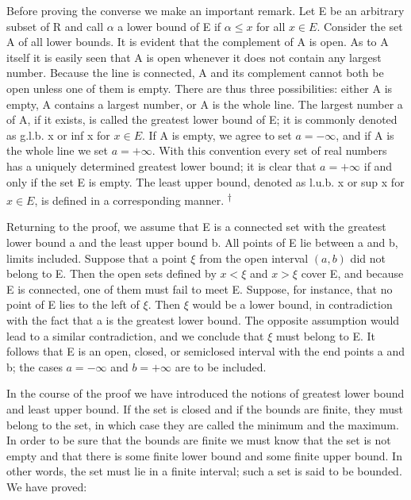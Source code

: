 Before proving the converse we make an important remark. Let E be an arbitrary subset of R and call $\alpha$ a lower bound of E if $\alpha \leq x$ for all $x \in E$. Consider the set A of all lower bounds. It is evident that the complement of A is open. As to A itself it is easily seen that A is open whenever it does not contain any largest number. Because the line is connected, A and its complement cannot both be open unless one of them is empty. There are thus three possibilities: either A is empty, A contains a largest number, or A is the whole line. The largest number a of A, if it exists, is called the greatest lower bound of E; it is commonly denoted as g.l.b. x or inf x for $x \in E$. If A is empty, we agree to set $a = -\infty$, and if A is the whole line we set $a = +\infty$. With this convention every set of real numbers has a uniquely determined greatest lower bound; it is clear that $a = +\infty$ if and only if the set E is empty. The least upper bound, denoted as l.u.b. x or sup x for $x \in E$, is defined in a corresponding manner. \hyperlink{fn:71:dagger}{\textsuperscript{\ensuremath{\dagger}}}

Returning to the proof, we assume that E is a connected set with the greatest lower bound a and the least upper bound b. All points of E lie between a and b, limits included. Suppose that a point $\xi$ from the open interval $(a,b)$ did not belong to E. Then the open sets defined by $x < \xi$ and $x > \xi$ cover E, and because E is connected, one of them must fail to meet E. Suppose, for instance, that no point of E lies to the left of $\xi$. Then $\xi$ would be a lower bound, in contradiction with the fact that a is the greatest lower bound. The opposite assumption would lead to a similar contradiction, and we conclude that $\xi$ must belong to E. It follows that E is an open, closed, or semiclosed interval with the end points a and b; the cases $a = -\infty$ and $b = +\infty$ are to be included.

\begingroup\renewcommand{\thefootnote}{}\endgroup

In the course of the proof we have introduced the notions of greatest lower bound and least upper bound. If the set is closed and if the bounds are finite, they must belong to the set, in which case they are called the minimum and the maximum. In order to be sure that the bounds are finite we must know that the set is not empty and that there is some finite lower bound and some finite upper bound. In other words, the set must lie in a finite interval; such a set is said to be bounded. We have proved:

